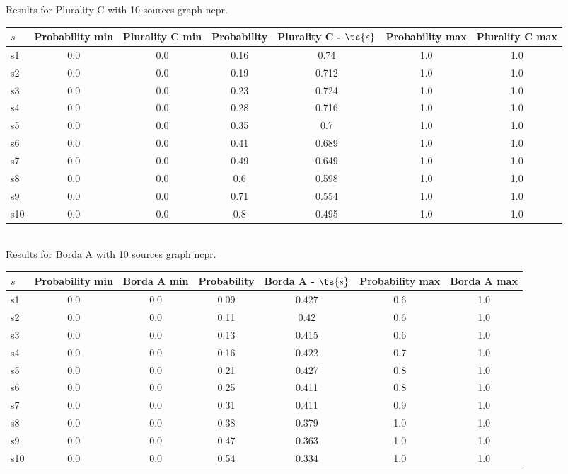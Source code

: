 \documentclass{article}
\begin{document}
\noindent Results for Plurality C with 10 sources graph ncpr.

\noindent\begin{tabular}{|l|c|c|c|c|c|c|}
\hline
$s$& Probability min & Plurality C min & Probability & Plurality C - $\ts{s}$ & Probability max & Plurality C max\\
\hline
s1 &0.0 & 0.0 & 0.16 & 0.74 & 1.0 & 1.0\\
\hline
s2 &0.0 & 0.0 & 0.19 & 0.712 & 1.0 & 1.0\\
\hline
s3 &0.0 & 0.0 & 0.23 & 0.724 & 1.0 & 1.0\\
\hline
s4 &0.0 & 0.0 & 0.28 & 0.716 & 1.0 & 1.0\\
\hline
s5 &0.0 & 0.0 & 0.35 & 0.7 & 1.0 & 1.0\\
\hline
s6 &0.0 & 0.0 & 0.41 & 0.689 & 1.0 & 1.0\\
\hline
s7 &0.0 & 0.0 & 0.49 & 0.649 & 1.0 & 1.0\\
\hline
s8 &0.0 & 0.0 & 0.6 & 0.598 & 1.0 & 1.0\\
\hline
s9 &0.0 & 0.0 & 0.71 & 0.554 & 1.0 & 1.0\\
\hline
s10 &0.0 & 0.0 & 0.8 & 0.495 & 1.0 & 1.0\\
\hline
\end{tabular}\\

\noindent Results for Borda A with 10 sources graph ncpr.

\noindent\begin{tabular}{|l|c|c|c|c|c|c|}
\hline
$s$& Probability min & Borda A min & Probability & Borda A - $\ts{s}$ & Probability max & Borda A max\\
\hline
s1 &0.0 & 0.0 & 0.09 & 0.427 & 0.6 & 1.0\\
\hline
s2 &0.0 & 0.0 & 0.11 & 0.42 & 0.6 & 1.0\\
\hline
s3 &0.0 & 0.0 & 0.13 & 0.415 & 0.6 & 1.0\\
\hline
s4 &0.0 & 0.0 & 0.16 & 0.422 & 0.7 & 1.0\\
\hline
s5 &0.0 & 0.0 & 0.21 & 0.427 & 0.8 & 1.0\\
\hline
s6 &0.0 & 0.0 & 0.25 & 0.411 & 0.8 & 1.0\\
\hline
s7 &0.0 & 0.0 & 0.31 & 0.411 & 0.9 & 1.0\\
\hline
s8 &0.0 & 0.0 & 0.38 & 0.379 & 1.0 & 1.0\\
\hline
s9 &0.0 & 0.0 & 0.47 & 0.363 & 1.0 & 1.0\\
\hline
s10 &0.0 & 0.0 & 0.54 & 0.334 & 1.0 & 1.0\\
\hline
\end{tabular}\\
\end{document}
